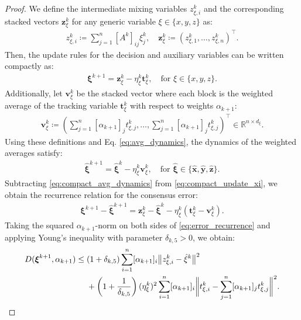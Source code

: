 \documentclass{article}
\theoremstyle{plain}
\theoremstyle{definition}
\theoremstyle{remark}
\begin{document}
\begin{proof}
We define the intermediate mixing variables $z_{\xi,i}^k$ and the corresponding stacked vectors $\mathbf{z}_{\xi}^k$ for any generic variable $\xi \in \{x, y, z\}$ as:
\begin{align*}
    z_{\xi,i}^k \coloneqq \sum_{j=1}^n [A^k]_{ij}\xi_j^k, \quad \mathbf{z}_{\xi}^k \coloneqq (z_{\xi,1}^k, \ldots, z_{\xi,n}^k)^\top.
\end{align*}
Then, the update rules for the decision and auxiliary variables can be written compactly as:
\begin{align}\label{eq:compact_update_xi}
    \boldsymbol{\xi}^{k+1} = \mathbf{z}_{\xi}^k - \eta_{\xi}^k \mathbf{t}_{\xi}^{k}, \quad \text{for } \xi \in \{x, y, z\}.
\end{align}
Additionally, let $\mathbf{v}_{\xi}^k$ be the stacked vector where each block is the weighted average of the tracking variable $\mathbf{t}_{\xi}^k$ with respect to weights $\alpha_{k+1}$:
\begin{align*}
    \mathbf{v}_{\xi}^k \coloneqq \left( \sum_{j=1}^n [\alpha_{k+1}]_j t_{\xi,j}^k, \ldots, \sum_{j=1}^n [\alpha_{k+1}]_j t_{\xi,j}^k \right)^\top \in \mathbb{R}^{n \times d_\xi}.
\end{align*}
Using these definitions and Eq. \eqref{eq:avg_dynamics}, the dynamics of the weighted averages satisfy:
\begin{align}\label{eq:compact_avg_dynamics}
    \hat{\boldsymbol{\xi}}^{k+1} = \hat{\boldsymbol{\xi}}^k - \eta_{\xi}^{k} \mathbf{v}_{\xi}^k, \quad \text{for } \hat{\boldsymbol{\xi}} \in \{\mathbf{\hat{x}}, \mathbf{\hat{y}}, \mathbf{\hat{z}}\}.
\end{align}
Subtracting \eqref{eq:compact_avg_dynamics} from \eqref{eq:compact_update_xi}, we obtain the recurrence relation for the consensus error:
\begin{align}\label{eq:error_recurrence}
    \boldsymbol{\xi}^{k+1} - \hat{\boldsymbol{\xi}}^{k+1} = \mathbf{z}_{\xi}^{k} - \hat{\boldsymbol{\xi}}^{k} - \eta_{\xi}^{k}(\mathbf{t}_{\xi}^{k} - \mathbf{v}_{\xi}^{k}).
\end{align}
Taking the squared $\alpha_{k+1}$-norm on both sides of \eqref{eq:error_recurrence} and applying Young's inequality with parameter $\delta_{k,5} > 0$, we obtain:
\begin{align}
    D(\boldsymbol{\xi}^{k+1},\alpha_{k+1}) \leq{}& (1+\delta_{k,5}) \sum_{i=1}^{n}[\alpha_{k+1}]_{i}\big\|z_{\xi,i}^{k}-\hat{\xi}^{k}\big\|^{2} \notag \\
    &+ \left(1+\frac{1}{\delta_{k,5}}\right)(\eta_{\xi}^{k})^{2}\sum_{i=1}^{n}[\alpha_{k+1}]_{i}\bigg\|t_{\xi,i}^{k}-\sum_{j=1}^{n}[\alpha_{k+1}]_{j}t_{\xi,j}^{k}\bigg\|^{2}.

\end{align}
\end{proof}
\end{document}
